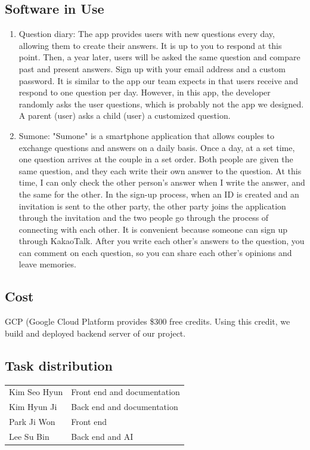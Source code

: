 \documentclass[conference]{IEEEtran}
\begin{document}
\subsection{Software in Use}
    \begin{enumerate}
        \item Question diary:
        The app provides users with new questions every day, allowing them to create their answers. It is up to you to respond at this point. Then, a year later, users will be asked the same question and compare past and present answers. Sign up with your email address and a custom password. It is similar to the app our team expects in that users receive and respond to one question per day. However, in this app, the developer randomly asks the user questions, which is probably not the app we designed. A parent (user) asks a child (user) a customized question.
        \item Sumone:
        "Sumone" is a smartphone application that allows couples to exchange questions and answers on a daily basis. Once a day, at a set time, one question arrives at the couple in a set order. Both people are given the same question, and they each write their own answer to the question. At this time, I can only check the other person's answer when I write the answer, and the same for the other. In the sign-up process, when an ID is created and an invitation is sent to the other party, the other party joins the application through the invitation and the two people go through the process of connecting with each other. It is convenient because someone can sign up through KakaoTalk. After you write each other's answers to the question, you can comment on each question, so you can share each other's opinions and leave memories.
    \end{enumerate}
    
\subsection{Cost}
GCP (Google Cloud Platform provides \$300 free credits. Using this credit, we build and deployed backend server of our project.

\subsection{Task distribution}
\begin{table}[H]
    \centering
    \begin{tabular}{m{3cm}|m{4cm}}
    \toprule
    Kim Seo Hyun & Front end and documentation \\
    Kim Hyun Ji & Back end and documentation\\
    Park Ji Won & Front end\\
    Lee Su Bin & Back end and AI\\
    \bottomrule
    \end{tabular}
    \end{table}
\newpage
\end{document}

